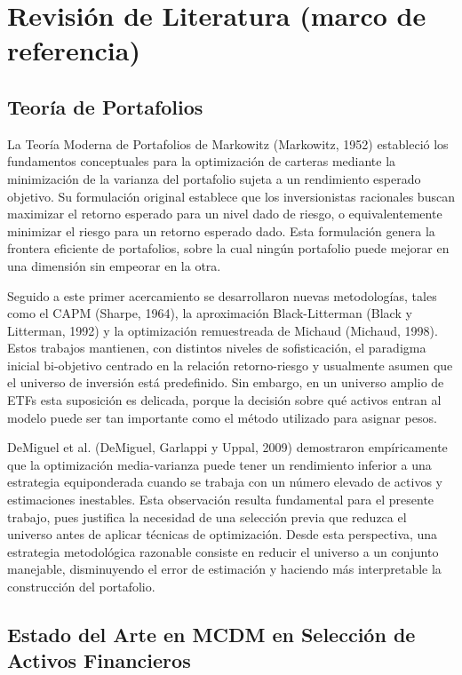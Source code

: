 \documentclass[12pt,letterpaper]{article}
\begin{document}
\clearpage
\section{Revisión de Literatura (marco de referencia)}

\subsection{Teoría de Portafolios}

La Teoría Moderna de Portafolios de Markowitz (Markowitz, 1952) estableció los fundamentos conceptuales para la optimización de carteras mediante la minimización de la varianza del portafolio sujeta a un rendimiento esperado objetivo. Su formulación original establece que los inversionistas racionales buscan maximizar el retorno esperado para un nivel dado de riesgo, o equivalentemente minimizar el riesgo para un retorno esperado dado. Esta formulación genera la frontera eficiente de portafolios, sobre la cual ningún portafolio puede mejorar en una dimensión sin empeorar en la otra.

Seguido a este primer acercamiento se desarrollaron nuevas metodologías, tales como el CAPM (Sharpe, 1964), la aproximación Black-Litterman (Black y Litterman, 1992) y la optimización remuestreada de Michaud (Michaud, 1998). Estos trabajos mantienen, con distintos niveles de sofisticación, el paradigma inicial bi-objetivo centrado en la relación retorno-riesgo y usualmente asumen que el universo de inversión está predefinido. Sin embargo, en un universo amplio de ETFs esta suposición es delicada, porque la decisión sobre qué activos entran al modelo puede ser tan importante como el método utilizado para asignar pesos.

DeMiguel et al. (DeMiguel, Garlappi y Uppal, 2009) demostraron empíricamente que la optimización media-varianza puede tener un rendimiento inferior a una estrategia equiponderada cuando se trabaja con un número elevado de activos y estimaciones inestables. Esta observación resulta fundamental para el presente trabajo, pues justifica la necesidad de una selección previa que reduzca el universo antes de aplicar técnicas de optimización. Desde esta perspectiva, una estrategia metodológica razonable consiste en reducir el universo a un conjunto manejable, disminuyendo el error de estimación y haciendo más interpretable la construcción del portafolio.

\subsection{Estado del Arte en MCDM en Selección de Activos Financieros}
\end{document}
